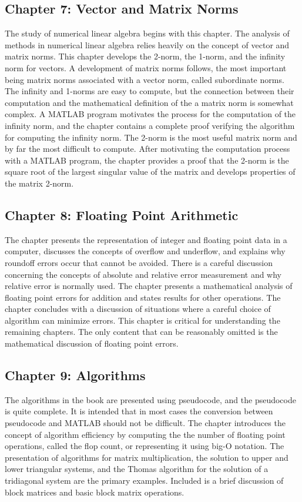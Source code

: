 \documentclass[../main.tex]{subfiles}
\begin{document}
\subsection*{Chapter 7: Vector and Matrix Norms}
The study of numerical linear algebra begins with this chapter. The analysis of methods in numerical linear algebra relies heavily on the concept of vector and matrix norms. This chapter develops the 2-norm, the 1-norm, and the infinity norm for vectors. A development of matrix norms follows, the most important being matrix norms associated with a vector norm, called subordinate norms. The infinity and 1-norms are easy to compute, but the connection between their computation and the mathematical definition of the a matrix norm is somewhat complex. A MATLAB program motivates the process for the computation of the infinity norm, and the chapter contains a complete proof verifying the algorithm for computing the infinity norm. The 2-norm is the most useful matrix norm and by far the most difficult to compute. After motivating the computation process with a MATLAB program, the chapter provides a proof that the 2-norm is the square root of the largest singular value of the matrix and develops properties of the matrix 2-norm.

\subsection*{Chapter 8: Floating Point Arithmetic}
The chapter presents the representation of integer and floating point data in a computer, discusses the concepts of overflow and underflow, and explains why roundoff errors occur that cannot be avoided. There is a careful discussion concerning the concepts of absolute and relative error measurement and why relative error is normally used. The chapter presents a mathematical analysis of floating point errors for addition and states results for other operations. The chapter concludes with a discussion of situations where a careful choice of algorithm can minimize errors. This chapter is critical for understanding the remaining chapters. The only content that can be reasonably omitted is the mathematical discussion of floating point
errors.

\subsection*{Chapter 9: Algorithms}
The algorithms in the book are presented using pseudocode, and the pseudocode is quite complete. It is intended that in most cases the conversion between pseudocode and MATLAB should not be difficult. The chapter introduces the concept of algorithm efficiency by computing the the number of floating point operations, called the flop count, or representing it using big-O notation. The presentation of algorithms for matrix multiplication, the solution to upper and lower triangular systems, and the Thomas algorithm for the solution of a tridiagonal system are the primary examples. Included is a brief discussion of block matrices and basic block matrix operations.
\end{document}
